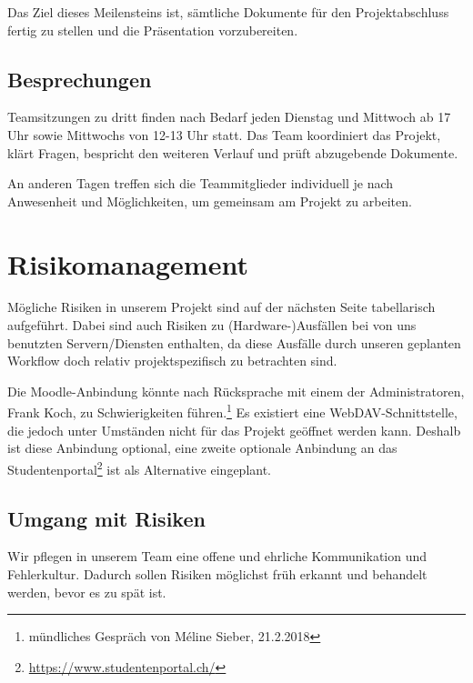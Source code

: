 \documentclass[a4paper]{article}
\let\oldsection\section
\renewcommand\section{\clearpage\oldsection}
\begin{document}
Das Ziel dieses Meilensteins ist, sämtliche Dokumente für den Projektabschluss fertig zu stellen und die Präsentation vorzubereiten.

\subsection{Besprechungen}
Teamsitzungen zu dritt finden nach Bedarf jeden Dienstag und Mittwoch ab 17 Uhr sowie Mittwochs von 12-13 Uhr statt. Das Team koordiniert das Projekt, klärt Fragen, bespricht den weiteren Verlauf und prüft abzugebende Dokumente.

An anderen Tagen treffen sich die Teammitglieder individuell je nach Anwesenheit und Möglichkeiten, um gemeinsam am Projekt zu arbeiten.


\section{Risikomanagement}
Mögliche Risiken in unserem Projekt sind auf der nächsten Seite tabellarisch
aufgeführt. Dabei sind auch Risiken zu (Hardware-)Ausfällen bei von uns
benutzten Servern/Diensten enthalten, da diese Ausfälle durch unseren geplanten
Workflow doch relativ projektspezifisch zu betrachten sind.

Die Moodle-Anbindung könnte nach Rücksprache mit einem der Administratoren,
Frank Koch, zu Schwierigkeiten führen.\footnote{mündliches Gespräch von Méline Sieber, 21.2.2018} Es existiert eine WebDAV-Schnittstelle, die jedoch unter Umständen nicht für das Projekt geöffnet werden kann. Deshalb ist diese Anbindung optional, eine zweite optionale Anbindung an das
Studentenportal\footnote{\url{https://www.studentenportal.ch/}} ist als  Alternative eingeplant.

\subsection{Umgang mit Risiken}

Wir pflegen in unserem Team eine offene und ehrliche Kommunikation und
Fehlerkultur. Dadurch sollen Risiken möglichst früh erkannt und behandelt
werden, bevor es zu spät ist.
\end{document}
